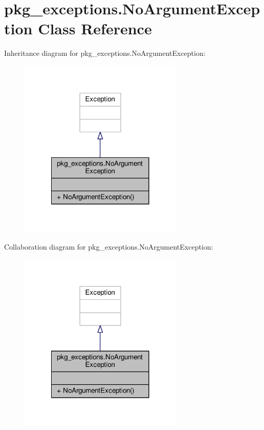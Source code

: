 \hypertarget{classpkg__exceptions_1_1NoArgumentException}{\section{pkg\-\_\-exceptions.\-No\-Argument\-Exception Class Reference}
\label{classpkg__exceptions_1_1NoArgumentException}
}


Inheritance diagram for pkg\-\_\-exceptions.\-No\-Argument\-Exception\-:
\nopagebreak
\begin{figure}[H]
\begin{center}
\leavevmode
\includegraphics[width=222pt]{classpkg__exceptions_1_1NoArgumentException__inherit__graph}
\end{center}
\end{figure}


Collaboration diagram for pkg\-\_\-exceptions.\-No\-Argument\-Exception\-:
\nopagebreak
\begin{figure}[H]
\begin{center}
\leavevmode
\includegraphics[width=222pt]{classpkg__exceptions_1_1NoArgumentException__coll__graph}
\end{center}
\end{figure}
